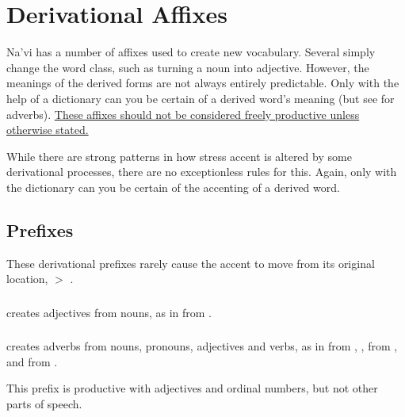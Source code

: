 
\section{Derivational Affixes}\label{lingop:affixes}
\noindent Na'vi has a number of affixes used to create new vocabulary.
Several simply change the word class, such as turning a noun into
adjective.  However, the meanings of the derived forms are not always
entirely predictable.  Only with the help of a dictionary can you be
certain of a derived word's meaning (but see  for
adverbs).  \uline{These affixes should not be considered freely
productive unless otherwise stated.}

While there are strong patterns in how stress accent is
altered by some derivational processes, there are no exceptionless
rules for this.  Again, only with the dictionary can you be certain of
the accenting of a derived word.


\subsection{Prefixes} These derivational prefixes rarely cause the
accent to move from its original location,  
$>$  . 

\subsubsection{}  creates adjectives from nouns, as in
  from  .

\subsubsection{}  creates adverbs from nouns, pronouns,
adjectives and verbs, as in   from
,  ,   from
 , and   from 
. 

This prefix is productive with adjectives and ordinal numbers, but not
other parts of speech.


